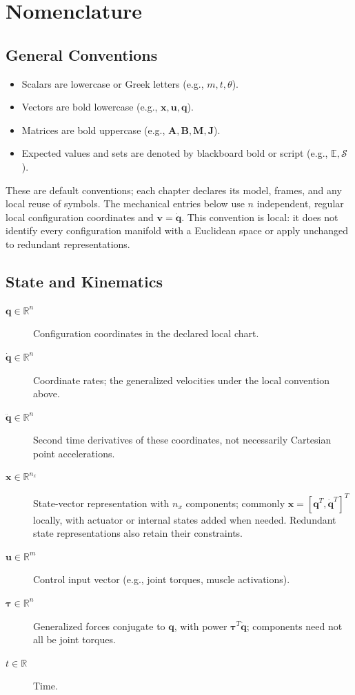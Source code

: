 \chapter*{Nomenclature}

\section*{General Conventions}
\begin{itemize}
    \item Scalars are lowercase or Greek letters (e.g., $m, t, \theta$).
    \item Vectors are bold lowercase (e.g., $\mathbf{x}, \mathbf{u}, \mathbf{q}$).
    \item Matrices are bold uppercase (e.g., $\mathbf{A}, \mathbf{B}, \mathbf{M}, \mathbf{J}$).
    \item Expected values and sets are denoted by blackboard bold or script (e.g., $\mathbb{E}, \mathcal{S}$).
\end{itemize}

These are default conventions; each chapter declares its model, frames, and
any local reuse of symbols. The mechanical entries below use $n$ independent,
regular local configuration coordinates and $\mathbf{v}=\dot{\mathbf{q}}$.
This convention is local: it does not identify every configuration manifold
with a Euclidean space or apply unchanged to redundant representations.

\section*{State and Kinematics}
\begin{description}
    \item[$\mathbf{q} \in \mathbb{R}^n$] Configuration coordinates in the declared local chart.
    \item[$\dot{\mathbf{q}} \in \mathbb{R}^n$] Coordinate rates; the generalized velocities under the local convention above.
    \item[$\ddot{\mathbf{q}} \in \mathbb{R}^n$] Second time derivatives of these coordinates, not necessarily Cartesian point accelerations.
    \item[$\mathbf{x} \in \mathbb{R}^{n_x}$] State-vector representation with $n_x$ components; commonly $\mathbf{x} = [\mathbf{q}^T, \dot{\mathbf{q}}^T]^T$ locally, with actuator or internal states added when needed. Redundant state representations also retain their constraints.
    \item[$\mathbf{u} \in \mathbb{R}^m$] Control input vector (e.g., joint torques, muscle activations).
    \item[$\boldsymbol{\tau} \in \mathbb{R}^n$] Generalized forces conjugate to $\mathbf{q}$, with power $\boldsymbol{\tau}^T\dot{\mathbf{q}}$; components need not all be joint torques.
    \item[$t \in \mathbb{R}$] Time.
\end{description}


